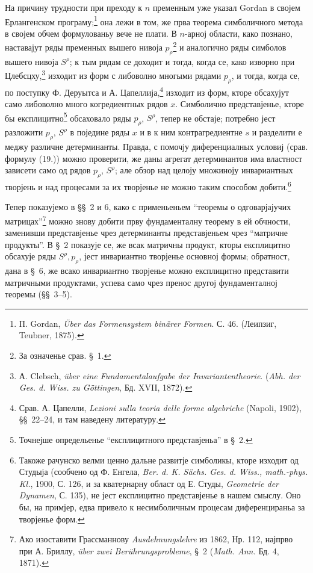 \documentclass[11pt]{article}
\begin{document}
На причину трудности при преходу к $n$ пременным уже указал Gordan в својем Ерлангенском програму;\footnote{П. Gordan, \emph{Über das Formensystem binärer Formen}. С. 46. (Леипзиг, Teubner, 1875).} она лежи в том, же прва теорема симболичного метода в својем обчем формулованьу вече не плати. В $n$-арној области, како познано, наставајут ряды пременных вышего нивоја $p_\rho$\footnote{За означенье срав. \S\ 1.} и аналогично ряды симболов вышего нивоја $S^\rho$; к тым рядам се доходит и тогда, когда се, како изворно при Цлебсцху,\footnote{А. Clebsch, \emph{über eine Fundamentalaufgabe der Invariantentheorie}. (\emph{Abh. der Ges. d. Wiss. zu Göttingen}, Бд. XVII, 1872).} изходит из форм с либоволно многыми рядами $p_\rho$, и тогда, когда се, по поступку Ф. Деруытса и А. Цапеллија,\footnote{Срав. А. Цапелли, \emph{Lezioni sulla teoria delle forme algebriche} (Napoli, 1902), \S\S\ 22--24, и там наведену литературу.} изходит из форм, кторе обсахујут само либоволно много когредиентных рядов $x$. Симболично представјенье, кторе бы експлицитно\footnote{Точнејше определьенье ``експлицитного представјеньа'' в \S\ 2.} обсаховало ряды $p_\rho$, $S^\rho$, тепер не обстаје; потребно јест разложити $p_\rho$, $S^\rho$ в поједине ряды $x$ и в к ним контрагредиентне $s$ и разделити е меджу различне детерминанты. Правда, с помочју диференциалных условиј (срав. формулу (19.)) можно проверити, же даны агрегат детерминантов има властност зависети само од рядов $p_\rho$, $S^\rho$; але обзор над целоју множиноју инвариантных творјень и над процесами за их творјенье не можно таким способом добити.\footnote{Такоже рачунско велми ценно дальне развитје симболикы, кторе изходит од Студыја (сообчено од Ф. Енгела, \emph{Ber. d. K. Sächs. Ges. d. Wiss., math.-phys. Kl.}, 1900, С. 126, и за кватернарну област од Е. Студы, \emph{Geometrie der Dynamen}, С. 135), не јест експлицитно представјенье в нашем смыслу. Оно бы, на примјер, едва привело к несимболичным процесам диференцираньа за творјенье форм.}

Тепер показујемо в \S\S\ 2 и 6, како с применьеньем ``теоремы о одговарјајучих матрицах''\footnote{Ако изоставити Грассманнову \emph{Ausdehnungslehre} из 1862, Нр. 112, најпрво при А. Бриллу, \emph{über zwei Berührungsprobleme}, \S\ 2 (\emph{Math. Ann.} Бд. 4, 1871).} можно знову добити прву фундаменталну теорему в ей обчности, заменивши представјенье чрез детерминанты представјеньем чрез ``матричне продукты''. В \S\ 2 показује се, же всак матричны продукт, кторы експлицитно обсахује ряды $S^\rho,p_\rho$, јест инвариантно творјенье основној формы; обратност, дана в \S\ 6, же всако инвариантно творјенье можно експлицитно представити матричными продуктами, успева само чрез пренос другој фундаменталној теоремы (\S\S\ 3--5).
\end{document}
